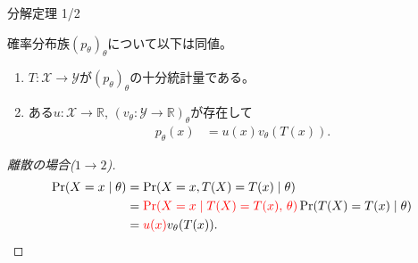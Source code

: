 \documentclass[lualatex,handout]{beamer}
\newcommand{\mycolor}[2]{%
  \begingroup
  \colorlet{currentcolor}{.}%
  \color{#1}#2%
  \color{currentcolor}%
  \endgroup
}
\newcommand{\emm}[1]{\mycolor{red}{#1}}
\theoremstyle{definition}
\begin{document}
\begin{frame}{分解定理 1/2}
\footnotesize
\begin{theorem}
確率分布族$(p_\theta)_\theta$について以下は同値。
\begin{enumerate}
\item $T\colon\mathcal{X}\to\mathcal{Y}$が$(p_\theta)_\theta$の十分統計量である。
\item ある$u\colon\mathcal{X}\to\mathbb{R}$, $(v_\theta\colon \mathcal{Y}\to\mathbb{R})_\theta$が存在して
\begin{align*}
p_\theta(x) &= u(x) v_\theta(T(x)).
\end{align*}
\end{enumerate}
\end{theorem}
\begin{proof}[\small 離散の場合($1\to 2$)]
\begin{align*}
\Pr(X=x\mid \theta) &= \Pr(X=x, T(X) = T(x)\mid \theta)\\
&= \emm{\Pr(X=x\mid T(X) = T(x),\,\theta)}\Pr(T(X)=T(x)\mid\theta)\\
&= \emm{u(x)}v_\theta(T(x)).
\end{align*}
\end{proof}
\end{frame}
\end{document}
